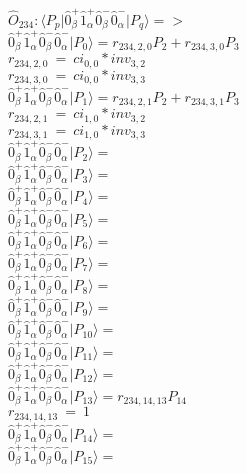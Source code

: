 \documentclass[14pt]{article}
\begin{document}
    $\hat{O}_{234}:  \langle{P_p}\vert \hat{0}_{\beta}^{+}\hat{1}_{\alpha}^{+}\hat{0}_{\beta}^{-}\hat{0}_{\alpha}^{-} \vert{P_q}\rangle => $ \\ 
    $ \hat{0}_{\beta}^{+}\hat{1}_{\alpha}^{+}\hat{0}_{\beta}^{-}\hat{0}_{\alpha}^{-} \vert{P_{0}}\rangle = {r}_{234,2,0}P_{2}+{r}_{234,3,0}P_{3} $ \\ 
    ${r}_{234,2,0}\ =\ {ci}_{0,0}*{inv}_{3,2} $ \\ 
    ${r}_{234,3,0}\ =\ {ci}_{0,0}*{inv}_{3,3} $ \\ 
    $ \hat{0}_{\beta}^{+}\hat{1}_{\alpha}^{+}\hat{0}_{\beta}^{-}\hat{0}_{\alpha}^{-} \vert{P_{1}}\rangle = {r}_{234,2,1}P_{2}+{r}_{234,3,1}P_{3} $ \\ 
    ${r}_{234,2,1}\ =\ {ci}_{1,0}*{inv}_{3,2} $ \\ 
    ${r}_{234,3,1}\ =\ {ci}_{1,0}*{inv}_{3,3} $ \\ 
    $ \hat{0}_{\beta}^{+}\hat{1}_{\alpha}^{+}\hat{0}_{\beta}^{-}\hat{0}_{\alpha}^{-} \vert{P_{2}}\rangle =  $ \\ 
    $ \hat{0}_{\beta}^{+}\hat{1}_{\alpha}^{+}\hat{0}_{\beta}^{-}\hat{0}_{\alpha}^{-} \vert{P_{3}}\rangle =  $ \\ 
    $ \hat{0}_{\beta}^{+}\hat{1}_{\alpha}^{+}\hat{0}_{\beta}^{-}\hat{0}_{\alpha}^{-} \vert{P_{4}}\rangle =  $ \\ 
    $ \hat{0}_{\beta}^{+}\hat{1}_{\alpha}^{+}\hat{0}_{\beta}^{-}\hat{0}_{\alpha}^{-} \vert{P_{5}}\rangle =  $ \\ 
    $ \hat{0}_{\beta}^{+}\hat{1}_{\alpha}^{+}\hat{0}_{\beta}^{-}\hat{0}_{\alpha}^{-} \vert{P_{6}}\rangle =  $ \\ 
    $ \hat{0}_{\beta}^{+}\hat{1}_{\alpha}^{+}\hat{0}_{\beta}^{-}\hat{0}_{\alpha}^{-} \vert{P_{7}}\rangle =  $ \\ 
    $ \hat{0}_{\beta}^{+}\hat{1}_{\alpha}^{+}\hat{0}_{\beta}^{-}\hat{0}_{\alpha}^{-} \vert{P_{8}}\rangle =  $ \\ 
    $ \hat{0}_{\beta}^{+}\hat{1}_{\alpha}^{+}\hat{0}_{\beta}^{-}\hat{0}_{\alpha}^{-} \vert{P_{9}}\rangle =  $ \\ 
    $ \hat{0}_{\beta}^{+}\hat{1}_{\alpha}^{+}\hat{0}_{\beta}^{-}\hat{0}_{\alpha}^{-} \vert{P_{10}}\rangle =  $ \\ 
    $ \hat{0}_{\beta}^{+}\hat{1}_{\alpha}^{+}\hat{0}_{\beta}^{-}\hat{0}_{\alpha}^{-} \vert{P_{11}}\rangle =  $ \\ 
    $ \hat{0}_{\beta}^{+}\hat{1}_{\alpha}^{+}\hat{0}_{\beta}^{-}\hat{0}_{\alpha}^{-} \vert{P_{12}}\rangle =  $ \\ 
    $ \hat{0}_{\beta}^{+}\hat{1}_{\alpha}^{+}\hat{0}_{\beta}^{-}\hat{0}_{\alpha}^{-} \vert{P_{13}}\rangle = {r}_{234,14,13}P_{14} $ \\ 
    ${r}_{234,14,13}\ =\ 1 $ \\ 
    $ \hat{0}_{\beta}^{+}\hat{1}_{\alpha}^{+}\hat{0}_{\beta}^{-}\hat{0}_{\alpha}^{-} \vert{P_{14}}\rangle =  $ \\ 
    $ \hat{0}_{\beta}^{+}\hat{1}_{\alpha}^{+}\hat{0}_{\beta}^{-}\hat{0}_{\alpha}^{-} \vert{P_{15}}\rangle =  $ \\ 
    
\end{document}
